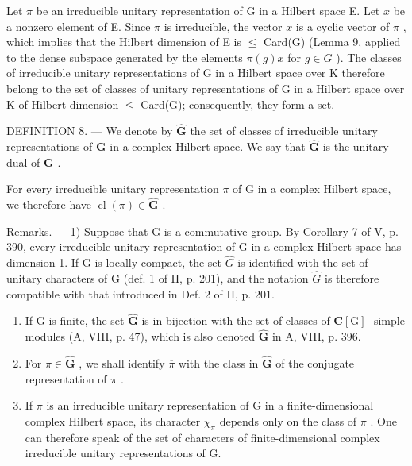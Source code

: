 Let \(\pi\) be an irreducible unitary representation of G in a Hilbert space E. Let \(x\) be a nonzero element of E. Since \(\pi\) is irreducible, the vector \(x\) is a cyclic vector of \(\pi\) , which implies that the Hilbert dimension of E is \(\leqslant\) Card(G) (Lemma 9, applied to the dense subspace generated by the elements \(\pi(g)x\) for \(g \in G\) ). The classes of irreducible unitary representations of G in a Hilbert space over K therefore belong to the set of classes of unitary representations of G in a Hilbert space over K of Hilbert dimension \(\leqslant\) Card(G); consequently, they form a set.

DEFINITION 8. --- We denote by \(\widehat{\mathbf{G}}\) the set of classes of irreducible unitary representations of \(\mathbf{G}\) in a complex Hilbert space. We say that \(\widehat{\mathbf{G}}\) is the unitary dual of \(\mathbf{G}\) .

For every irreducible unitary representation \(\pi\) of G in a complex Hilbert space, we therefore have \(\operatorname{cl}(\pi) \in \widehat{\mathbf{G}}\) .

Remarks. --- 1) Suppose that G is a commutative group. By Corollary 7 of V, p. 390, every irreducible unitary representation of G in a complex Hilbert space has dimension 1. If G is locally compact, the set \(\widehat{G}\) is identified with the set of unitary characters of G (def. 1 of II, p. 201), and the notation \(\widehat{G}\) is therefore compatible with that introduced in Def. 2 of II, p. 201.

\begin{enumerate}
\def\labelenumi{\arabic{enumi})}
\setcounter{enumi}{1}
\item
  If G is finite, the set \(\widehat{\mathbf{G}}\) is in bijection with the set of classes of \(\mathbf{C}[\mathrm{G}]\) -simple modules (A, VIII, p. 47), which is also denoted \(\widehat{\mathbf{G}}\) in A, VIII, p. 396.
\item
  For \(\pi \in \widehat{\mathbf{G}}\) , we shall identify \(\overline{\pi}\) with the class in \(\widehat{\mathbf{G}}\) of the conjugate representation of \(\pi\) .
\item
  If \(\pi\) is an irreducible unitary representation of G in a finite-dimensional complex Hilbert space, its character \(\chi_{\pi}\) depends only on the class of \(\pi\) . One can therefore speak of the set of characters of finite-dimensional complex irreducible unitary representations of G.
\end{enumerate}


